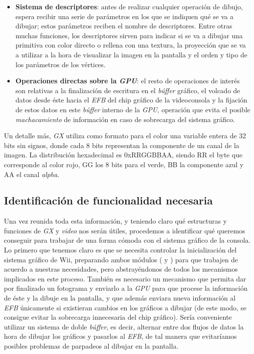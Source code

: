\begin{itemize}
\item \textbf{Sistema de descriptores}: antes de realizar cualquier operación de dibujo,  espera recibir una serie de parámetros en los que se indiquen qué se va a dibujar; estos parámetros reciben el nombre de descriptores. Entre otras muchas funciones, los descriptores sirven para indicar si se va a dibujar una primitiva con color directo o rellena con una textura, la proyección que se va a utilizar a la hora de visualizar la imagen en la pantalla y el orden y tipo de los parámetros de los vértices.
\item \textbf{Operaciones directas sobre la \emph{GPU}}: el resto de operaciones de interés son relativas a la finalización de escritura en el \emph{búffer} gráfico, el volcado de datos desde éste hacia el \emph{EFB} del chip gráfico de la videoconsola y la fijación de estos datos en este \emph{búffer} interno de la \emph{GPU}, operación que evita el posible \emph{machacamiento} de información en caso de sobrecarga del sistema gráfico.
\end{itemize}

Un detalle más, \emph{GX} utiliza como formato para el color una variable entera de 32 bits sin signos, donde cada 8 bits representan la componente de un canal de la imagen. La distribución hexadecimal es 0xRRGGBBAA, siendo RR el byte que corresponde al color rojo, GG los 8 bits para el verde, BB la componente azul y AA el canal \emph{alpha}.

\subsection{Identificación de funcionalidad necesaria}

Una vez reunida toda esta información, y teniendo claro qué estructuras y funciones de \emph{GX} y \emph{video} nos serán útiles, procedemos a identificar qué queremos conseguir para trabajar de una forma cómoda con el sistema gráfico de la consola.\\

Lo primero que tenemos claro es que se necesita controlar la inicialización del sistema gráfico de Wii, preparando ambos módulos ( y ) para que trabajen de acuerdo a nuestras necesidades, pero abstrayéndonos de todos los mecanismos implicados en este proceso. También es necesario un mecanismo que permita dar por finalizado un fotograma y enviarlo a la \emph{GPU} para que procese la información de éste y la dibuje en la pantalla, y que además enviara nueva información al \emph{EFB} únicamente si existieran cambios en los gráficos a dibujar (de este modo, se consigue evitar la sobrecarga innecesaria del chip gráfico). Sería conveniente utilizar un sistema de doble \emph{búffer}, es decir, alternar entre dos flujos de datos la hora de dibujar los gráficos y pasarlos al \emph{EFB}, de tal manera que evitaríamos posibles problemas de parpadeos al dibujar en la pantalla.\\

